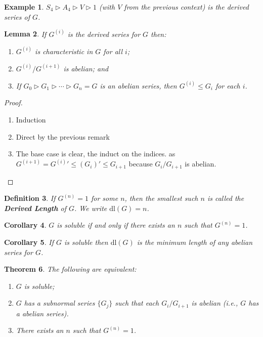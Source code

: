 \documentclass[a4paper,10pt]{article}
\newtheorem{thm}{Theorem}
\newtheorem{Def}[thm]{Definition}
\newtheorem{Cor}[thm]{Corollary}
\newtheorem{eg}[thm]{Example}
\newtheorem{Lem}[thm]{Lemma}
\begin{document}
\begin{eg}
$S_4 \triangleright A_4 \triangleright V \triangleright 1$ (with $V$ from the previous context) is the derived series of $G$. 
\end{eg}

\begin{Lem}
If $G^{(i)}$ is the derived series for $G$ then:
\begin{enumerate}
\item $G^{(i)}$ is characteristic in $G$ for all $i$;
\item $G^{(i)} / G^{(i+1)}$ is abelian; and
\item If $G_0 \triangleright G_1 \triangleright \cdots \triangleright G_n = G$ is an abelian series, then $G^{(i)} \leq G_i$ for each $i$.
\end{enumerate}
\end{Lem}

\begin{proof}
\begin{enumerate}
\item Induction
\item Direct by the previous remark
\item The base case is clear, the induct on the indices. as $G^{(i+1)} = G^{(i)}{}' \leq (G_{i})' \leq G_{i+1}$ because $G_{i} / G_{i+1}$ is abelian.
\end{enumerate}
\end{proof}

\begin{Def}
If $G^{(n)} = 1$ for some $n$, then the smallest such $n$ is called the \textbf{Derived Length} of $G$. We write $\text{dl}(G) = n$. 
\end{Def}

\begin{Cor}
$G$ is soluble if and only if there exists an $n$ such that $G^{(n)} = 1$. 
\end{Cor}

\begin{Cor}
If $G$ is soluble then $\text{dl}(G)$ is the minimum length of any abelian series for $G$. 
\end{Cor}

\begin{thm}
The following are equivalent:
\begin{enumerate}
\item $G$ is soluble;
\item $G$ has a subnormal series $\{G_j\}$ such that each $G_i / G_{i+1}$ is abelian (i.e., $G$ has a abelian series).
\item There exists an $n$ such that $G^{(n)} = 1$. 
\end{enumerate}

\end{thm}
\end{document}
